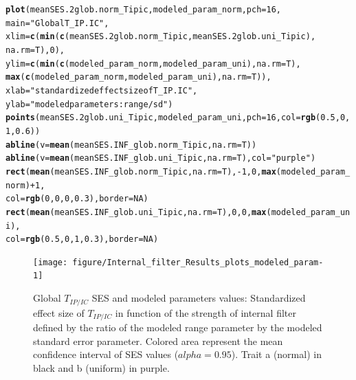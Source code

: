 \documentclass[12pt]{article}\usepackage[]{graphicx}\usepackage[]{color}
\makeatletter
\newcommand{\hlnum}[1]{\textcolor[rgb]{0.686,0.059,0.569}{#1}}%
\newcommand{\hlstr}[1]{\textcolor[rgb]{0.192,0.494,0.8}{#1}}%
\newcommand{\hlopt}[1]{\textcolor[rgb]{0,0,0}{#1}}%
\newcommand{\hlstd}[1]{\textcolor[rgb]{0.345,0.345,0.345}{#1}}%
\newcommand{\hlkwc}[1]{\textcolor[rgb]{0.333,0.667,0.333}{#1}}%
\newcommand{\hlkwd}[1]{\textcolor[rgb]{0.737,0.353,0.396}{\textbf{#1}}}%
\newenvironment{kframe}{%
 \def\at@end@of@kframe{}%
 \ifinner\ifhmode%
  \def\at@end@of@kframe{\end{minipage}}%
  \begin{minipage}{\columnwidth}%
 \fi\fi%
 \def\FrameCommand##1{\hskip\@totalleftmargin \hskip-\fboxsep
 \colorbox{shadecolor}{##1}\hskip-\fboxsep
     \hskip-\linewidth \hskip-\@totalleftmargin \hskip\columnwidth}%
 \MakeFramed {\advance\hsize-\width
   \@totalleftmargin\z@ \linewidth\hsize
   \@setminipage}}%
 {\par\unskip\endMakeFramed%
 \at@end@of@kframe}
\newenvironment{knitrout}{}{} %
\makeatother
\begin{document}
\begin{knitrout}
\begin{kframe}
\begin{alltt}
\hlkwd{plot}\hlstd{(meanSES.2glob.norm_Tipic, modeled_param_norm,} \hlkwc{pch} \hlstd{=} \hlnum{16}\hlstd{,}
     \hlkwc{main} \hlstd{=} \hlstr{"Global T_IP.IC"}\hlstd{,}
     \hlkwc{xlim} \hlstd{=} \hlkwd{c}\hlstd{(}\hlkwd{min}\hlstd{(}\hlkwd{c}\hlstd{(meanSES.2glob.norm_Tipic, meanSES.2glob.uni_Tipic),}
              \hlkwc{na.rm} \hlstd{= T),} \hlnum{0}\hlstd{),}
     \hlkwc{ylim} \hlstd{=} \hlkwd{c}\hlstd{(}\hlkwd{min}\hlstd{(}\hlkwd{c}\hlstd{(modeled_param_norm, modeled_param_uni),} \hlkwc{na.rm} \hlstd{= T),}
     \hlkwd{max}\hlstd{(}\hlkwd{c}\hlstd{(modeled_param_norm, modeled_param_uni),} \hlkwc{na.rm} \hlstd{= T)),}
     \hlkwc{xlab} \hlstd{=} \hlstr{"standardized effect size of T_IP.IC"}\hlstd{,}
     \hlkwc{ylab} \hlstd{=} \hlstr{"modeled parameters: range/sd"}\hlstd{)}
\hlkwd{points}\hlstd{(meanSES.2glob.uni_Tipic, modeled_param_uni,} \hlkwc{pch} \hlstd{=} \hlnum{16}\hlstd{,} \hlkwc{col} \hlstd{=} \hlkwd{rgb}\hlstd{(}\hlnum{0.5}\hlstd{,} \hlnum{0}\hlstd{,} \hlnum{1}\hlstd{,} \hlnum{0.6}\hlstd{))}
\hlkwd{abline}\hlstd{(}\hlkwc{v} \hlstd{=} \hlkwd{mean}\hlstd{(meanSES.INF_glob.norm_Tipic,} \hlkwc{na.rm} \hlstd{= T))}
\hlkwd{abline}\hlstd{(}\hlkwc{v} \hlstd{=} \hlkwd{mean}\hlstd{(meanSES.INF_glob.uni_Tipic,} \hlkwc{na.rm} \hlstd{= T),} \hlkwc{col} \hlstd{=} \hlstr{"purple"}\hlstd{)}
\hlkwd{rect}\hlstd{(}\hlkwd{mean}\hlstd{(meanSES.INF_glob.norm_Tipic,} \hlkwc{na.rm} \hlstd{= T),} \hlopt{-}\hlnum{1}\hlstd{,} \hlnum{0}\hlstd{,} \hlkwd{max}\hlstd{(modeled_param_norm)} \hlopt{+} \hlnum{1}\hlstd{,}
     \hlkwc{col} \hlstd{=} \hlkwd{rgb}\hlstd{(}\hlnum{0}\hlstd{,} \hlnum{0}\hlstd{,} \hlnum{0}\hlstd{,} \hlnum{0.3}\hlstd{),} \hlkwc{border} \hlstd{=} \hlnum{NA}\hlstd{)}
\hlkwd{rect}\hlstd{(}\hlkwd{mean}\hlstd{(meanSES.INF_glob.uni_Tipic,} \hlkwc{na.rm} \hlstd{= T),} \hlnum{0}\hlstd{,} \hlnum{0}\hlstd{,} \hlkwd{max}\hlstd{(modeled_param_uni),}
     \hlkwc{col} \hlstd{=} \hlkwd{rgb}\hlstd{(}\hlnum{0.5}\hlstd{,} \hlnum{0}\hlstd{,} \hlnum{1}\hlstd{,} \hlnum{0.3}\hlstd{),} \hlkwc{border} \hlstd{=} \hlnum{NA}\hlstd{)}
\end{alltt}
\end{kframe}\begin{figure}

{\centering \texttt{[image: figure/Internal\_filter\_Results\_plots\_modeled\_param-1]} 

}

\caption[Global $T_{IP/IC}$ SES and modeled parameters values]{Global $T_{IP/IC}$ SES and modeled parameters values: Standardized effect size of $T_{IP/IC}$ in function of the strength of internal filter defined by the ratio of the modeled range parameter by the modeled standard error parameter. Colored area represent the mean confidence interval of SES values ($alpha = 0.95$). Trait a (normal) in black and b (uniform) in purple.\label{fig:Internal_filter_Results_plots_modeled_param}}
\end{figure}


\end{knitrout}
\end{document}
